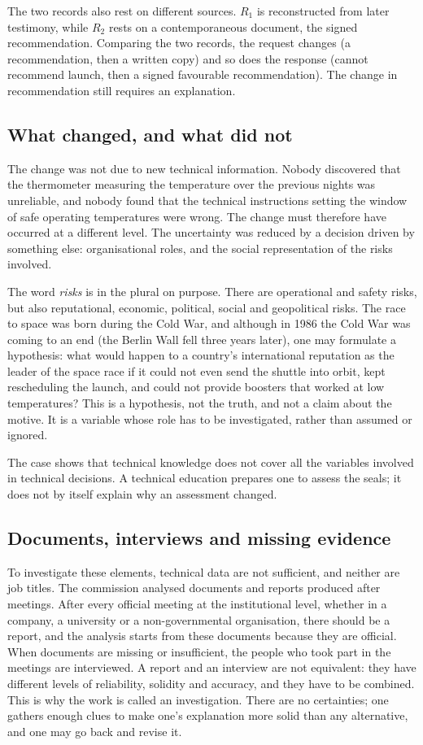 The two records also rest on different sources. $R_1$ is reconstructed from later testimony, while $R_2$ rests on a contemporaneous document, the signed recommendation. Comparing the two records, the request changes (a recommendation, then a written copy) and so does the response (cannot recommend launch, then a signed favourable recommendation). The change in recommendation still requires an explanation.

\subsection{What changed, and what did not}
The change was not due to new technical information. Nobody discovered that the thermometer measuring the temperature over the previous nights was unreliable, and nobody found that the technical instructions setting the window of safe operating temperatures were wrong. The change must therefore have occurred at a different level. The uncertainty was reduced by a decision driven by something else: organisational roles, and the social representation of the risks involved.

The word \emph{risks} is in the plural on purpose. There are operational and safety risks, but also reputational, economic, political, social and geopolitical risks. The race to space was born during the Cold War, and although in 1986 the Cold War was coming to an end (the Berlin Wall fell three years later), one may formulate a hypothesis: what would happen to a country's international reputation as the leader of the space race if it could not even send the shuttle into orbit, kept rescheduling the launch, and could not provide boosters that worked at low temperatures? This is a hypothesis, not the truth, and not a claim about the motive. It is a variable whose role has to be investigated, rather than assumed or ignored.

The case shows that technical knowledge does not cover all the variables involved in technical decisions. A technical education prepares one to assess the seals; it does not by itself explain why an assessment changed.

\subsection{Documents, interviews and missing evidence}
To investigate these elements, technical data are not sufficient, and neither are job titles. The commission analysed documents and reports produced after meetings. After every official meeting at the institutional level, whether in a company, a university or a non-governmental organisation, there should be a report, and the analysis starts from these documents because they are official. When documents are missing or insufficient, the people who took part in the meetings are interviewed. A report and an interview are not equivalent: they have different levels of reliability, solidity and accuracy, and they have to be combined. This is why the work is called an investigation. There are no certainties; one gathers enough clues to make one's explanation more solid than any alternative, and one may go back and revise it.


